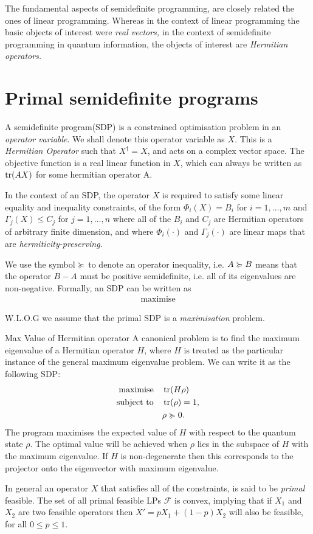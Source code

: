 The fundamental aspects of semidefinite programming, are closely related the ones of linear programming. Whereas in the context of linear programming the basic objects of interest were \textit{real vectors,} in the context of semidefinite programming in quantum information, the objects of interest are \textit{Hermitian operators.}

\section{Primal semidefinite programs}
A semidefinite program(SDP) is a constrained optimisation problem in an \textit{operator variable}. We shall denote this operator variable as $X$. This is a \textit{Hermitian Operator} such that $X^\dagger = X$, and acts on a complex vector space.
The objective function is a real linear function in $X$, which can always be written as $\tr(AX)$ for some hermitian operator A.

In the context of an SDP, the operator $X$ is required to satisfy some linear equality and inequality constraints, of the form $\Phi_{i}(X) = B_{i}$ for $i = 1, \ldots , m$ and $\Gamma_{j}(X) \le C_{j}$ for $j = 1, \ldots , n$ where all of the $B_{i}$ and $C_{j}$ are Hermitian operators of arbitrary finite dimension, and where $\Phi_{i}(\cdot)$ and $\Gamma_{j}(\cdot)$ are linear maps that are \textit{hermiticity-preserving.}

We use the symbol $\succcurlyeq$ to denote an operator inequality, i.e. $A\succcurlyeq B$ means that the operator $B-A$ must be positive semidefinite, i.e. all of its eigenvalues are non-negative.
Formally, an SDP can be written as
\begin{align}
    \text{maximise}
\end{align}

W.L.O.G we assume that the primal SDP is a \textit{maximisation} problem.

\begin{prf}{Max Value of Hermitian operator}
    A canonical problem is to find the maximum eigenvalue of a Hermitian operator $H$, where $H$ is treated as the particular instance of the general maximum eigenvalue problem.
    We can write it as the following SDP:
    \begin{align}
        \text{maximise} \quad   & \tr(H\rho)     \\
        \text{subject to} \quad & \tr(\rho) = 1, \\
                                & \rho \succcurlyeq 0.
    \end{align}
    The program maximises the expected value of $H$ with respect to the quantum state $\rho$. The optimal value will be achieved when $\rho$ lies in the subspace of $H$ with the maximum eigenvalue. If $H$ is non-degenerate then this corresponds to the projector onto the eigenvector with maximum eigenvalue.
\end{prf}
In general an operator $X$ that satisfies all of the constraints, is said to be \textit{primal} feasible. The set of all primal feasible LPs $\mathcal{F}$ is convex, implying that if $X_{1}$ and $X_{2}$ are two feasible operators then $X' = pX_{1} + (1-p)X_{2}$ will also be feasible, for all $0 \le p \le 1$.


